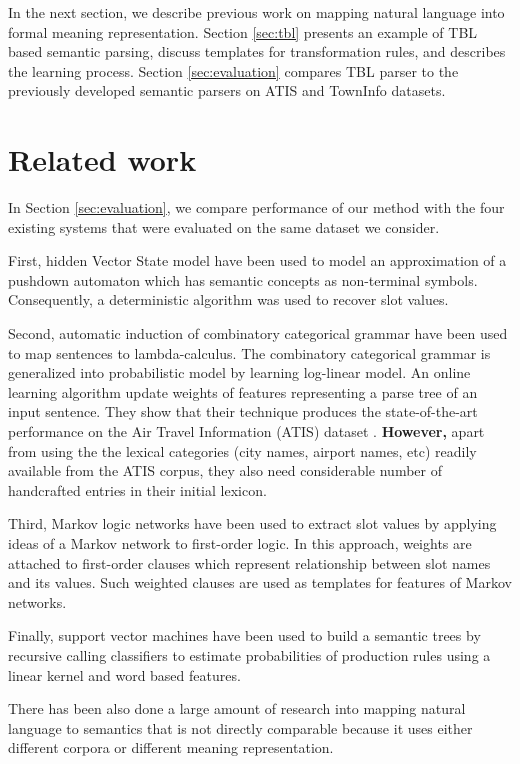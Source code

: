 \documentclass[11pt]{article}
\begin{document}
In the next section, we describe previous work on mapping natural language into formal meaning representation. Section \ref{sec:tbl} presents an example of TBL based semantic parsing, discuss templates for transformation rules, and describes the learning process. Section \ref{sec:evaluation} compares TBL parser to the previously developed semantic parsers on ATIS \cite{atis94} and TownInfo \cite{mairesse09} datasets.

\section{Related work}

In Section \ref{sec:evaluation}, we compare performance of our method with the four existing systems that were evaluated on the same dataset we consider. 

First, hidden Vector State model \cite{he06} have been used to model an approximation of a pushdown automaton which has semantic concepts as non-terminal symbols. Consequently, a deterministic algorithm was used to recover slot values.

Second, automatic induction of combinatory categorical grammar \cite{zettlemoyer07} have been used to map sentences to lambda-calculus. The combinatory categorical grammar is generalized into probabilistic model by learning log-linear model. An online learning algorithm update weights of features representing a parse tree of an input sentence. They show that their technique produces the state-of-the-art performance on the Air Travel Information (ATIS) dataset \cite{atis94}. \textbf{However, }apart from using the the lexical categories (city names, airport names, etc) readily available from the ATIS corpus, they also need considerable number of handcrafted entries in their initial lexicon. 

Third, Markov logic networks \cite{meza08a,meza08b} have been used to extract slot values by applying ideas of a Markov network to first-order logic. In this approach, weights are attached to first-order clauses which represent relationship between slot names and its values. Such weighted clauses are used as templates for features of Markov networks.

Finally, support vector machines \cite{mairesse09} have been used to build a semantic trees by recursive calling classifiers to estimate probabilities of production rules using a linear kernel and word based features.

There has been also done a large amount of research into mapping natural language to semantics that is not directly comparable because it uses either different corpora or different meaning representation. 
\end{document}
